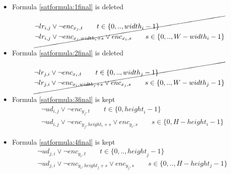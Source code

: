     \begin{itemize}
        \item Formula \ref{satformula:1final} is deleted
            \begin{equation*}
            \cancel{
            \begin{aligned}
                &\neg lr_{i,j} \vee \neg {enc}_{x_{j},t} \qquad t \in \{ 0,.., {width}_i -1\}
                \\
                &\neg lr_{i,j} \vee \neg {enc}_{x_{j},{width}_i+s} \vee {enc}_{x_{i},s} \qquad s \in \{ 0,.., W-{width}_i-1\}
            \end{aligned}
            }
            \end{equation*}
        \item Formula \ref{satformula:2final} is deleted
            \begin{equation*}
            \cancel{
            \begin{aligned}
            &\neg lr_{j,i} \vee \neg {enc}_{x_{i},t} \qquad t \in \{ 0,.., {width}_j -1\}
            \\
            &\neg lr_{j,i} \vee \neg {enc}_{x_{i},{width}_j+s} \vee {enc}_{x_{j},s} \qquad s \in \{ 0,.., W-{width}_j-1\}
            \end{aligned}
            }
            \end{equation*}
        
        \item Formula \ref{satformula:3final} is kept
            \begin{equation*}
            \begin{aligned}
                &\neg ud_{i,j} \vee \neg{enc}_{y_{j},t} \qquad t \in \{ 0, {height}_i -1\} \\
                &\neg ud_{i,j} \vee \neg {enc}_{y_{j},height_{i}+s} \vee enc_{y_{i},s} \qquad s \in \{ 0, H-height_i-1\}
            \end{aligned}
            \end{equation*}
    
        \item Formula \ref{satformula:4final} is kept
            \begin{equation*}
            \begin{aligned}
            &\neg ud_{j,i} \vee \neg{enc}_{y_{i},t} \qquad t \in \{ 0,.., {height}_j -1\}
            \\
            &\neg ud_{j,i} \vee \neg {enc}_{y_{i},height_{j}+s} \vee enc_{y_{j},s} \qquad s \in \{ 0,.., H-height_j-1\}
            \end{aligned}
            \end{equation*}
    \end{itemize}
